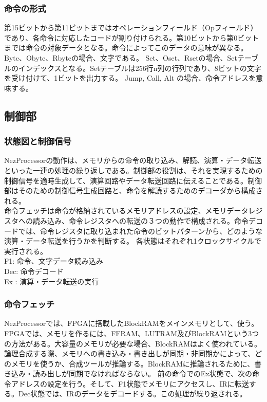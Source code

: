 \documentclass[paper]{ieicej}
\begin{document}
\subsubsection{命令の形式}
第15ビットから第11ビットまではオペレーションフィールド（Opフィールド）であり、各命令に対応したコードが割り付けられる。第10ビットから第0ビットまでは命令の対象データとなる。命令によってこのデータの意味が異なる。
Byte、Obyte、Rbyteの場合、文字である。
Set、Oset、Rsetの場合、Setテーブルのインデックスとなる。Setテーブルは256行n列の行列であり、8ビットの文字を受け付けて、1ビットを出力する。
Jump, Call, Alt の場合、命令アドレスを意味する。



\subsection{制御部}

\subsubsection{状態図と制御信号}
NezProcessorの動作は、メモリからの命令の取り込み、解読、演算・データ転送といった一連の処理の繰り返しである。制御部の役割は、それを実現するための制御信号を適時生成して、演算回路やデータ転送回路に伝えることである。制御部はそのための制御信号生成回路と、命令を解読するためのデコーダから構成される。\\
命令フェッチは命令が格納されているメモリアドレスの設定、メモリデータレジスタへの読み込み、命令レジスタへの転送の３つの動作で構成される。命令デコードでは、命令レジスタに取り込まれた命令のビットパターンから、どのような演算・データ転送を行うかを判断する。
各状態はそれぞれ1クロックサイクルで実行される。\\

F1: 命令、文字データ読み込み\\
Dec: 命令デコード\\
Ex : 演算・データ転送の実行\\

\subsubsection{命令フェッチ}
NezProcessorでは、FPGAに搭載したBlockRAMをメインメモリとして、使う。FPGAでは、メモリを作るには、FFRAM、LUTRAM及びBlockRAMという3つの方法がある。大容量のメモリが必要な場合、BlockRAMはよく使われている。論理合成する際、メモリへの書き込み・書き出しが同期・非同期かによって、どのメモリを使うか、合成ツールが推論する。BlockRAMに推論されるために、書き込み・読み出しが同期でなければならない。
前の命令でのEx状態で、次の命令アドレスの設定を行う。そして、F1状態でメモリにアクセスし、IRに転送する。Dec状態では、IRのデータをデコードする。この処理が繰り返される。
\end{document}
